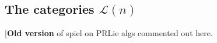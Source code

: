 \documentclass[11pt]{amsart}
\theoremstyle{plain}
\theoremstyle{definition}
\DeclareMathOperator{\im}{im}
\newcommand{\DASH}{\textup{--}}
\renewcommand{\to}{\longrightarrow}
\newcommand{\scrL}{\mathscr{L}}
\newcommand{\calL}{\mathcal{L}}
\newcommand{\calV}{\mathcal{V}}
\theoremstyle{plain}
\newcommand{\LieOperad}{{\scrL}}
\newcommand{\restn}[1]{#1^{[2]}}
\newcommand{\vect}[2]{\calV^{#1}_{#2}}
\begin{document}
\begin{homotopy operations for PRLs}
\subsection{The categories $\calL(n)$}\label{The categories Ln}
[\textbf{Old version} of spiel on PRLie algs commented out here.%
%
%

\end{homotopy operations for PRLs}
\end{document}
